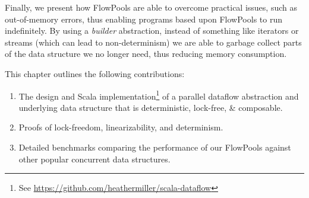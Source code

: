Finally, we present how FlowPools are able to overcome practical issues, such as
out-of-memory errors, thus enabling programs based upon FlowPools to run
indefinitely. By using a \textit{builder} abstraction, instead of something like
iterators or streams (which can lead to non-determinism) we are able to garbage
collect parts of the data structure we no longer need, thus reducing memory
consumption.

This chapter outlines the following contributions:
\begin{enumerate}
\item The design and Scala implementation\footnote{See \url{https://github.com/heathermiller/scala-dataflow}}
of a parallel dataflow abstraction and underlying data structure that
is deterministic, lock-free, \& composable.
\item Proofs of lock-freedom, linearizability, and determinism.
\item Detailed benchmarks comparing the performance of our FlowPools against
other popular concurrent data structures.
\end{enumerate}






